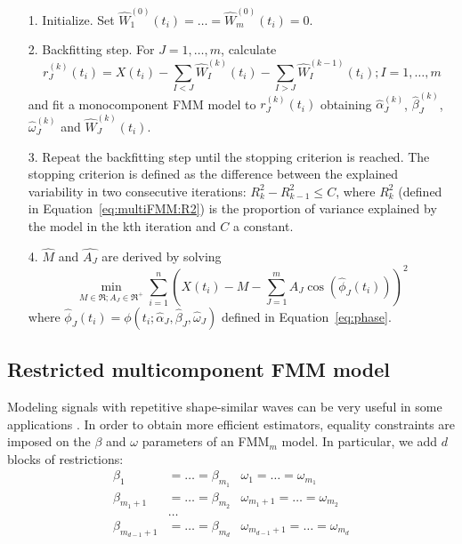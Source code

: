 \begin{enumerate}
   \item [1.] Initialize. Set $\hat{W}_1^{\left(0\right)}\left(t_i\right) = \dots = \hat{W}_m^{\left(0\right)}\left(t_i\right) =  0$. 	
   \item [2.] Backfitting step. For $J = 1, \dots ,m$, calculate
      \begin{equation} \label{eq:multiFMM:partialres}
         r_J^{\left(k\right)}\left(t_i\right) = X\left(t_i\right) - 
         \sum_{I < J} \hat{W}_I^{\left(k\right)}\left(t_i\right) - 
         \sum_{I > J} \hat{W}_I^{\left(k-1\right)}\left(t_i\right); 
         I = 1, \dots, m
      \end{equation}
     and fit a monocomponent FMM model to $r_J^{\left(k\right)}\left(t_i\right)$
     obtaining $\hat{\alpha}_J^{\left(k\right)}$, $\hat{\beta}_J^{\left(k\right)}$, 
     $\hat{\omega}_J^{\left(k\right)}$ and $\hat{W}_J^{\left(k\right)}\left(t_i\right)$.
    \item [3.] Repeat the backfitting step until the stopping criterion is reached. 
    The stopping criterion is defined as the difference between the explained
    variability in two consecutive iterations: $R_k^2 - R_{k-1}^2 \leq C$, where 
    $R_k^2$ (defined in Equation~\ref{eq:multiFMM:R2}) is the proportion of variance
    explained by the model in the kth iteration and $C$ a constant.  
   \item [4.] $\hat{M}$ and $\hat{A_J}$ are derived by solving
   \begin{equation} \label{eq:multiFMM:backfitting}
     \min_{M \in \Re; A_J \in \Re^+} \sum_{i=1}^n 
     \left(X\left(t_i\right) -  M - \sum_{J=1}^{m} 
     A_{J}\cos\left(\hat{\phi}_J\left(t_i\right)\right)\right)^2 
   \end{equation} 
   where $\hat{\phi}_J\left(t_i\right) = \phi\left(t_i; \hat{\alpha}_J, \hat{\beta}_J, \hat{\omega}_J\right)$ defined in Equation~\ref{eq:phase}.
\end{enumerate}

\subsection{Restricted multicomponent FMM model}\label{subsec:restFMM}
Modeling signals with repetitive shape-similar waves can be very useful in some applications \citep[see][]{RodriguezCollado+Rueda:2021}. In order to obtain more efficient estimators, equality constraints are imposed on the $\beta$ and $\omega$ parameters of an FMM$_m$ model. In particular, we add $d$ blocks of restrictions: 
%
\begin{align} \label{eq:multiFMM:betaRestr}
  \beta_1 & = \dots = \beta_{m_1}           & \omega_1 = \dots = \omega_{m_1}\\
  \beta_{m_1+1} & = \dots = \beta_{m_2}     & \omega_{m_1+1} = \dots = \omega_{m_2} \nonumber \\
  &\dots \nonumber \\
  \beta_{m_{d-1}+1} & = \dots = \beta_{m_d} & \omega_{m_{d-1}+1} = \dots = \omega_{m_d}\nonumber
\end{align}

